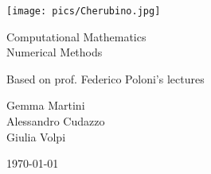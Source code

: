\documentclass[computational_mathematics.tex]{subfiles}
\begin{document}
\begin{titlepage}
    \begin{center}
    \vspace{3cm}
    
    \Large
    
    \vspace{2cm}
    
    \texttt{[image: pics/Cherubino.jpg]}
    
    \vspace{2.5cm}
    
    {\Huge \sc Computational Mathematics\\ Numerical Methods}
    
    \vspace{2cm}
    Based on prof. Federico Poloni's lectures
    
    \vspace{2cm}
    Gemma Martini\\ Alessandro Cudazzo\\ Giulia Volpi
    \vfill
    
    \today
    
    \end{center}
\end{titlepage}

\shipout\null

\tableofcontents
\let\tableofcontents\relax

\newpage



\newpage



\newpage



\newpage



\newpage



\newpage



\newpage



\newpage



\newpage



\newpage



\newpage



\newpage



\newpage



\newpage



\newpage



\newpage


\end{document}
